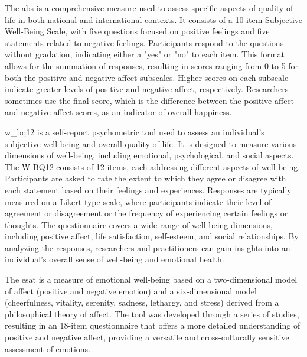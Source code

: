 \documentclass[a4paper,fleqn]{cas-dc}
\begin{document}
The \gls{abs} \cite{glatzer_affect_2014} is a comprehensive measure used to assess specific aspects of quality of life in both national and international contexts. It consists of a 10-item Subjective Well-Being Scale, with five questions focused on positive feelings and five statements related to negative feelings. Participants respond to the questions without gradation, indicating either a "yes" or "no" to each item. This format allows for the summation of responses, resulting in scores ranging from 0 to 5 for both the positive and negative affect subscales. Higher scores on each subscale indicate greater levels of positive and negative affect, respectively. Researchers sometimes use the final score, which is the difference between the positive affect and negative affect scores, as an indicator of overall happiness.

\gls{w_bq12} \cite{mitchell_psychometric_2001} is a self-report psychometric tool used to assess an individual's subjective well-being and overall quality of life. It is designed to measure various dimensions of well-being, including emotional, psychological, and social aspects. The W-BQ12 consists of 12 items, each addressing different aspects of well-being. Participants are asked to rate the extent to which they agree or disagree with each statement based on their feelings and experiences. Responses are typically measured on a Likert-type scale, where participants indicate their level of agreement or disagreement or the frequency of experiencing certain feelings or thoughts. The questionnaire covers a wide range of well-being dimensions, including positive affect, life satisfaction, self-esteem, and social relationships. By analyzing the responses, researchers and practitioners can gain insights into an individual's overall sense of well-being and emotional health.

The \gls{esat} \cite{yaden_emotional_2022} is a measure of emotional well-being based on a two-dimensional model of affect (positive and negative emotion) and a six-dimensional model (cheerfulness, vitality, serenity, sadness, lethargy, and stress) derived from a philosophical theory of affect. The tool was developed through a series of studies, resulting in an 18-item questionnaire that offers a more detailed understanding of positive and negative affect, providing a versatile and cross-culturally sensitive assessment of emotions. 
\end{document}
